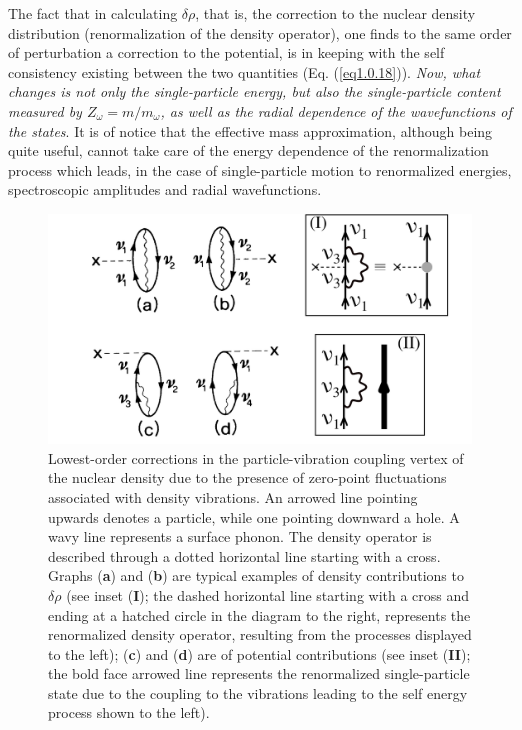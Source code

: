  The fact that in calculating $\delta\rho$, that is, the correction to the nuclear density distribution (renormalization of the density operator), one finds to the same order of perturbation a correction to the potential, is in keeping with the self consistency existing between the two quantities (Eq. (\ref{eq1.0.18})). \textit{Now, what changes is not only the single-particle energy, but also the single-particle content measured by $Z_\omega=m/m_\omega$, as well as the radial dependence of the wavefunctions of the states}. It is of notice that the effective mass approximation, although being quite useful, cannot take care of the energy dependence of the renormalization process which leads, in the case of single-particle motion to renormalized energies, spectroscopic amplitudes and radial wavefunctions. 
\begin{figure}
	\centerline {
		\includegraphics*[width=15cm, angle=0.]{introduccion/figs/fig0_8_1}
	}
	\caption{Lowest-order corrections in the particle-vibration coupling vertex of the nuclear density due to the presence of zero-point fluctuations associated with density vibrations. An arrowed line pointing upwards denotes a particle, while one pointing downward a hole. A wavy line represents a surface phonon. The density operator is described through a dotted horizontal line starting with a cross. Graphs (\textbf{a}) and (\textbf{b}) are typical examples of density contributions to $\delta\rho$ (see inset (\textbf{I}); the dashed horizontal line starting with a cross and ending at a hatched circle in the diagram to the right, represents the renormalized density operator, resulting from the processes displayed to the left); (\textbf{c}) and (\textbf{d}) are of potential contributions (see inset (\textbf{II}); the bold face arrowed line represents the renormalized single-particle state due to the coupling to the vibrations leading to the self energy process shown to the left).}
	\label{fig0.5.1}
\end{figure}
